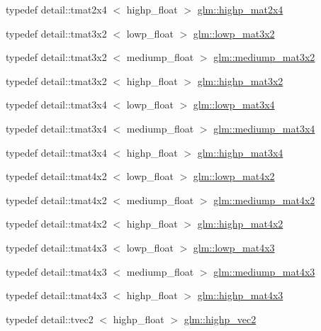 \begin{DoxyCompactItemize}
typedef detail\-::tmat2x4\*
$<$ highp\-\_\-float $>$ \hyperlink{group__core__precision_ga41deb7c45e9219ccccdc011aafd42f27}{glm\-::highp\-\_\-mat2x4}
\item 
typedef detail\-::tmat3x2\*
$<$ lowp\-\_\-float $>$ \hyperlink{group__core__precision_ga590ba3600da3c6dc36a0eb7574cbd6f6}{glm\-::lowp\-\_\-mat3x2}
\item 
typedef detail\-::tmat3x2\*
$<$ mediump\-\_\-float $>$ \hyperlink{group__core__precision_ga74c660239e7f6b76796f1b4990083ec6}{glm\-::mediump\-\_\-mat3x2}
\item 
typedef detail\-::tmat3x2\*
$<$ highp\-\_\-float $>$ \hyperlink{group__core__precision_gae46e3b35f72ae06bc7d38ff29a189cfb}{glm\-::highp\-\_\-mat3x2}
\item 
typedef detail\-::tmat3x4\*
$<$ lowp\-\_\-float $>$ \hyperlink{group__core__precision_ga1b202ac2d7cea4f30ad802471f6081ac}{glm\-::lowp\-\_\-mat3x4}
\item 
typedef detail\-::tmat3x4\*
$<$ mediump\-\_\-float $>$ \hyperlink{group__core__precision_gaa530d8f06a8f1187cd1e0c2ce46cac42}{glm\-::mediump\-\_\-mat3x4}
\item 
typedef detail\-::tmat3x4\*
$<$ highp\-\_\-float $>$ \hyperlink{group__core__precision_ga55fe92f6217fa20816f52f748fb399c7}{glm\-::highp\-\_\-mat3x4}
\item 
typedef detail\-::tmat4x2\*
$<$ lowp\-\_\-float $>$ \hyperlink{group__core__precision_gaf8f0828066f6c6fbd2c815832743e401}{glm\-::lowp\-\_\-mat4x2}
\item 
typedef detail\-::tmat4x2\*
$<$ mediump\-\_\-float $>$ \hyperlink{group__core__precision_gad8c4b5a61db5087e32506b2022442edd}{glm\-::mediump\-\_\-mat4x2}
\item 
typedef detail\-::tmat4x2\*
$<$ highp\-\_\-float $>$ \hyperlink{group__core__precision_gaea696a76cb6e8c9b85ee9f0fd2e38a05}{glm\-::highp\-\_\-mat4x2}
\item 
typedef detail\-::tmat4x3\*
$<$ lowp\-\_\-float $>$ \hyperlink{group__core__precision_ga072d9727aa59df856b83cfc01cb131bf}{glm\-::lowp\-\_\-mat4x3}
\item 
typedef detail\-::tmat4x3\*
$<$ mediump\-\_\-float $>$ \hyperlink{group__core__precision_ga2c1b39d629d83063a0d59cf14b4f52a3}{glm\-::mediump\-\_\-mat4x3}
\item 
typedef detail\-::tmat4x3\*
$<$ highp\-\_\-float $>$ \hyperlink{group__core__precision_ga940a4f42a51d8dee13869ca90aa24df6}{glm\-::highp\-\_\-mat4x3}
\item 
typedef detail\-::tvec2\*
$<$ highp\-\_\-float $>$ \hyperlink{group__core__precision_ga0747567a49e0fa00ecd05011c1645d69}{glm\-::highp\-\_\-vec2}

\end{DoxyCompactItemize}
